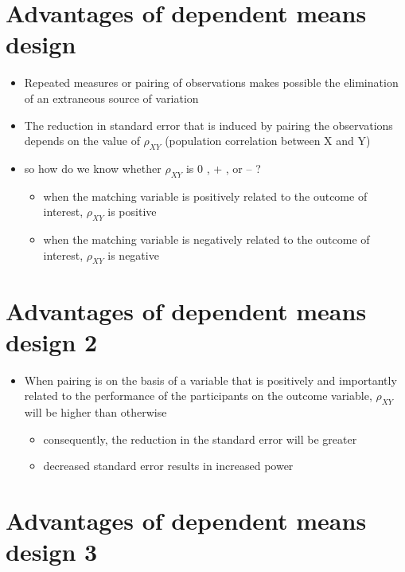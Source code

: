 \documentclass[12pt]{article}
\begin{document}
\section{Advantages of dependent means
design}\label{advantages-of-dependent-means-design}

\begin{itemize}
\itemsep1pt\parskip0pt
\item
  Repeated measures or pairing of observations makes possible the
  elimination of an extraneous source of variation
\item
  The reduction in standard error that is induced by pairing the
  observations depends on the value of \(\rho_{XY}\) (population
  correlation between X and Y)
\item
  so how do we know whether \(\rho_{XY}\) is 0 , + , or -- ?

  \begin{itemize}
  \itemsep1pt\parskip0pt
  \item
    when the matching variable is positively related to the outcome of
    interest, \(\rho_{XY}\) is positive
  \item
    when the matching variable is negatively related to the outcome of
    interest, \(\rho_{XY}\) is negative
  \end{itemize}
\end{itemize}

\section{Advantages of dependent means design
2}\label{advantages-of-dependent-means-design-2}

\begin{itemize}
\itemsep1pt\parskip0pt
\item
  When pairing is on the basis of a variable that is positively and
  importantly related to the performance of the participants on the
  outcome variable, \(\rho_{XY}\) will be higher than otherwise

  \begin{itemize}
  \itemsep1pt\parskip0pt
  \item
    consequently, the reduction in the standard error will be greater
  \item
    decreased standard error results in increased power
  \end{itemize}
\end{itemize}

\section{Advantages of dependent means design
3}\label{advantages-of-dependent-means-design-3}
\end{document}
